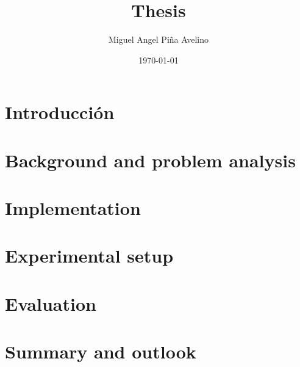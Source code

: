 \documentclass[11pt]{article}
\author{Miguel Angel Piña Avelino}
\date{\today}
\title{Thesis}
\begin{document}
\maketitle

\section{Introducción}
\section{Background and problem analysis}
\section{Implementation}
\section{Experimental setup}
\section{Evaluation}
\section{Summary and outlook}
\end{document}
